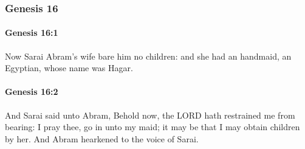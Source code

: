 	\subsubsection{Genesis 16} %
		\label{GENESIS-16}

		\paragraph{Genesis 16:1} %
			\label{GENESIS-16-1}

			Now Sarai Abram's wife bare him no children: and she had an handmaid, an Egyptian, whose name was Hagar.


		\paragraph{Genesis 16:2} %
			\label{GENESIS-16-2}

			And Sarai said unto Abram, Behold now, the LORD hath restrained me from bearing: I pray thee, go in unto my maid; it may be that I may obtain children by her. And Abram hearkened to the voice of Sarai.

